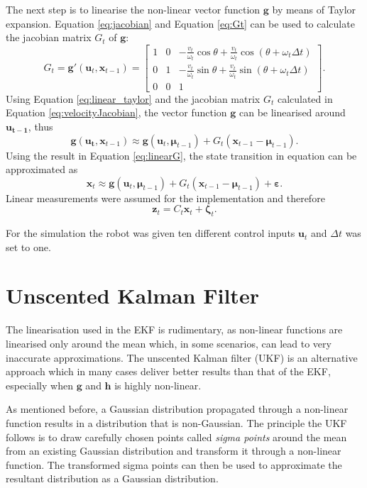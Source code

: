 \documentclass[12pt,oneside,openany,a4paper, %
afrikaans,english,
]{memoir}
\numberwithin{equation}{chapter}
\begin{document}
The next step is to linearise the non-linear vector function $\bm{g}$ by means of Taylor expansion. Equation \ref{eq:jacobian} and Equation \ref{eq:Gt} can be used to calculate the jacobian matrix $G_t$ of $\bm{g}$:
\begin{equation}\label{eq:velocityJacobian}
G_t = \bm{g}'(\bm{u}_t, \bm{x}_{t-1}) =
\begin{bmatrix}
1 & 0 & -\frac{v_t}{\omega_t} \cos\theta + \frac{v_t}{\omega_t} \cos(\theta + \omega_t \Delta t)\\
0 & 1 & -\frac{v_t}{\omega_t}\sin\theta + \frac{v_t}{\omega_t}\sin(\theta + \omega_t \Delta t)\\
0 & 0 & 1 
\end{bmatrix}.
\end{equation}
Using Equation \ref{eq:linear_taylor} and the jacobian matrix $G_t$ calculated in Equation \ref{eq:velocityJacobian}, the vector function $\bm{g}$ can be linearised around $\bm{u_{t-1}}$, thus
\begin{equation}\label{eq:linearG}
\bm{g}(\bm{u_t}, \bm{x}_{t-1}) \approx \bm{g}(\bm{u}_t, \bm{\mu}_{t-1}) + G_t(\bm{x}_{t-1} - 
\bm{\mu}_{t-1}).
\end{equation} 
Using the result in Equation \ref{eq:linearG}, the state transition in equation can be approximated as
\begin{equation}
\bm{x}_t \approx \bm{g}(\bm{u}_t, \bm{\mu}_{t-1}) + G_t(\bm{x}_{t-1} - \bm{\mu}_{t-1}) + \bm{\varepsilon}.
\end{equation} 
Linear measurements were assumed for the implementation and therefore
\begin{equation}
\bm{z}_t = C_t \bm{x}_t + \bm{\zeta}_t.
\end{equation}

For the simulation the robot was given ten different control inputs $\bm{u}_t$ and $\Delta t$ was set to one.
\section{Unscented Kalman Filter}
The linearisation used in the EKF is rudimentary, as non-linear functions are linearised only around the mean which, in some scenarios, can lead to very inaccurate approximations. The unscented Kalman filter (UKF) is an alternative approach which in many cases deliver better results than that of the EKF, especially when $\bm{g}$ and $\bm{h}$ is highly non-linear.

As mentioned before, a Gaussian distribution propagated through a non-linear function results in a distribution that is non-Gaussian. The principle the UKF follows is to draw carefully chosen points called \textit{sigma points} around the mean from an existing Gaussian distribution and transform it through a non-linear function. The transformed sigma points can then be used to approximate the resultant distribution as a Gaussian distribution.
\end{document}
